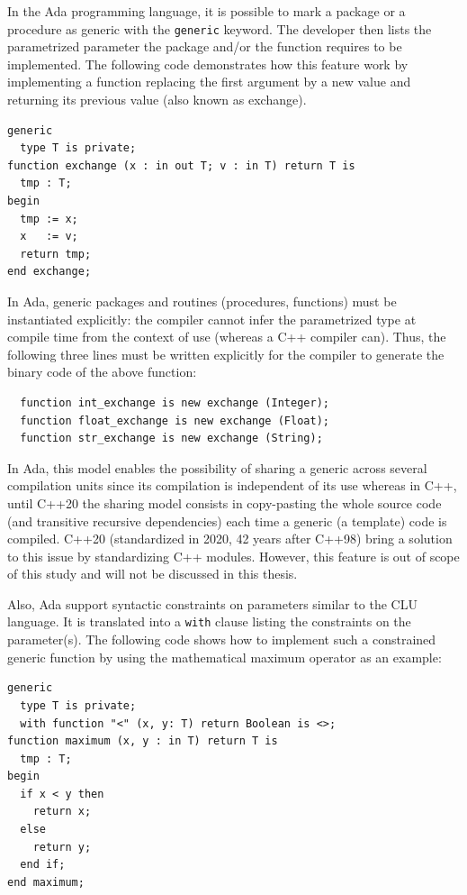 In the Ada programming language, it is possible to mark a package or a procedure as generic with the \texttt{generic}
keyword. The developer then lists the parametrized parameter the package and/or the function requires to be implemented.
The following code demonstrates how this feature work by implementing a function replacing the first argument by a new
value and returning its previous value (also known as exchange).

\begin{verbatim}
generic
  type T is private;
function exchange (x : in out T; v : in T) return T is
  tmp : T;
begin
  tmp := x;
  x   := v;
  return tmp;
end exchange;
\end{verbatim}

In Ada, generic packages and routines (procedures, functions) must be instantiated explicitly: the compiler cannot infer
the parametrized type at compile time from the context of use (whereas a C++ compiler can). Thus, the following three
lines must be written explicitly for the compiler to generate the binary code of the above function:
\begin{verbatim}
  function int_exchange is new exchange (Integer);
  function float_exchange is new exchange (Float);
  function str_exchange is new exchange (String);
\end{verbatim}

In Ada, this model enables the possibility of sharing a generic across several compilation units since its compilation is
independent of its use whereas in C++, until C++20 the sharing model consists in copy-pasting the whole source code
(and transitive recursive dependencies) each time a generic (a template) code is compiled. C++20 (standardized in 2020,
42 years after C++98) bring a solution to this issue by standardizing C++ modules. However, this feature is out of scope
of this study and will not be discussed in this thesis.

Also, Ada support syntactic constraints on parameters similar to the CLU language. It is translated into a \texttt{with}
clause listing the constraints on the parameter(s). The following code shows how to implement such a constrained generic
function by using the mathematical maximum operator as an example:

\begin{verbatim}
generic
  type T is private;
  with function "<" (x, y: T) return Boolean is <>;
function maximum (x, y : in T) return T is
  tmp : T;
begin
  if x < y then
    return x;
  else
    return y;
  end if;
end maximum;
\end{verbatim}

